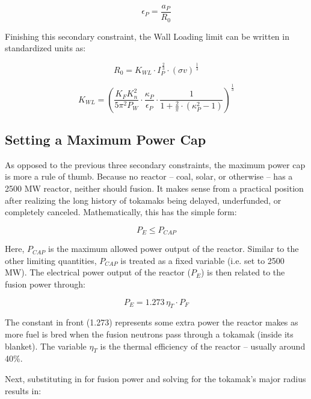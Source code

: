 \documentclass[11pt]{book}
\begin{document}
\begin{equation}
	\epsilon_P = \frac{a_P}{R_0}
\end{equation}

Finishing this secondary constraint, the Wall Loading limit can be written in standardized units as:

\begin{equation}
	R_0 = K_{WL} \cdot I_P^{ \, \frac{2}{3} } \cdot (\sigma v) ^{ \, \frac{1}{3} }
\end{equation}

\begin{equation}
	K_{WL} = \left( \frac{ K_F K_n^2 }{ 5 \pi^2 P_W } \cdot \frac{\kappa_P}{\epsilon_P} \cdot \frac{1}{1 + \frac{2}{\pi} \cdot ( \kappa_P^2 - 1 ) } \right) ^ { \frac{1}{3} }
\end{equation}

\subsection{Setting a Maximum Power Cap}

As opposed to the previous three secondary constraints, the maximum power cap is more a rule of thumb. Because no reactor -- coal, solar, or otherwise -- has a 2500 MW reactor, neither should fusion. It makes sense from a practical position after realizing the long history of tokamaks being delayed, underfunded, or completely canceled. Mathematically, this has the simple form:

\begin{equation}
	P_E \le P_{CAP}
\end{equation}

Here, $P_{CAP}$ is the maximum allowed power output of the reactor. Similar to the other limiting quantities, $P_{CAP}$ is treated as a fixed variable (i.e. set to 2500 MW). The electrical power output of the reactor ($P_E$) is then related to the fusion power through:

\begin{equation}
	P_E = 1.273 \, \eta_T \cdot P_F
\end{equation}

The constant in front (1.273) represents some extra power the reactor makes as more fuel is bred when the fusion neutrons pass through a tokamak (inside its blanket). The variable $\eta_T$ is the thermal efficiency of the reactor -- usually around 40\%.

Next, substituting in for fusion power and solving for the tokamak's major radius results in:
\end{document}
